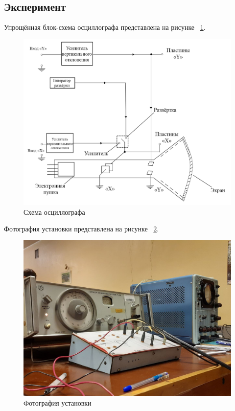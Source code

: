 \subsection{Эксперимент}
Упрощённая блок-схема осциллографа представлена на рисунке ~\ref{fig:Упрощённая блок-схема}.

\begin{figure}[H]
\centering
\includegraphics[width=1.0\textwidth]{Упрощённая блок-схема.png}
\caption{Схема осциллографа}
\label{fig:Упрощённая блок-схема}
\end{figure}

Фотография установки представлена на рисунке ~\ref{fig:Фотография установки}.

\begin{figure}[H]
\centering
\includegraphics[width=1.0\textwidth]{Фотография установки.jpg}
\caption{Фотография установки}
\label{fig:Фотография установки}
\end{figure}


